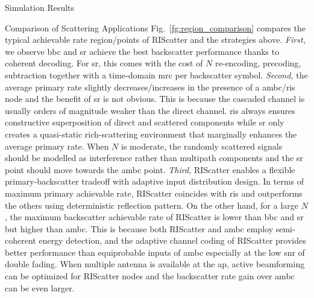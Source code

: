 \documentclass[journal]{IEEEtran}
\begin{document}
\begin{section}{Simulation Results}
\begin{subsection}{Comparison of Scattering Applications}
		Fig.~\ref{fg:region_comparison} compares the typical achievable rate region/points of RIScatter and the strategies above.
		\emph{First,} we observe \gls{bbc} and \gls{sr} achieve the best backscatter performance thanks to coherent decoding.
		For \gls{sr}, this comes with the cost of $N$ re-encoding, precoding, subtraction together with a time-domain \gls{mrc} per backscatter symbol.
		\emph{Second,} the average primary rate slightly decreases/increases in the presence of a \gls{ambc}/\gls{ris} node and the benefit of \gls{sr} is not obvious.
		This is because the cascaded channel is usually orders of magnitude weaker than the direct channel.
		\gls{ris} always ensures constructive superposition of direct and scattered components while \gls{sr} only creates a quasi-static rich-scattering environment that marginally enhances the average primary rate.
		When $N$ is moderate, the randomly scattered signals should be modelled as interference rather than multipath components and the \gls{sr} point should move towards the \gls{ambc} point.
		\emph{Third,} RIScatter enables a flexible primary-backscatter tradeoff with adaptive input distribution design.
		In terms of maximum primary achievable rate, RIScatter coincides with \gls{ris} and outperforms the others using deterministic reflection pattern.
		On the other hand, for a large $N$, the maximum backscatter achievable rate of RIScatter is lower than \gls{bbc} and \gls{sr} but higher than \gls{ambc}.
		This is because both RIScatter and \gls{ambc} employ semi-coherent energy detection, and the adaptive channel coding of RIScatter provides better performance than equiprobable inputs of \gls{ambc} especially at the low \gls{snr} of double fading.
		When multiple antenna is available at the \gls{ap}, active beamforming can be optimized for RIScatter nodes and the backscatter rate gain over \gls{ambc} can be even larger.
	\end{subsection}


\end{section}
\end{document}
